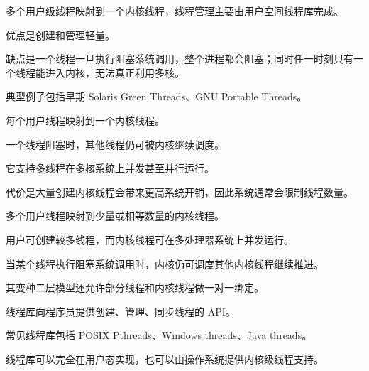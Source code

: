 \begin{points}
  \item 多个用户级线程映射到一个内核线程，线程管理主要由用户空间线程库完成。
  \item 优点是创建和管理轻量。
  \item 缺点是一个线程一旦执行阻塞系统调用，整个进程都会阻塞；同时任一时刻只有一个线程能进入内核，无法真正利用多核。
  \item 典型例子包括早期 Solaris Green Threads、GNU Portable Threads。
\end{points}


\begin{points}
  \item 每个用户线程映射到一个内核线程。
  \item 一个线程阻塞时，其他线程仍可被内核继续调度。
  \item 它支持多线程在多核系统上并发甚至并行运行。
  \item 代价是大量创建内核线程会带来更高系统开销，因此系统通常会限制线程数量。
\end{points}


\begin{points}
  \item 多个用户线程映射到少量或相等数量的内核线程。
  \item 用户可创建较多线程，而内核线程可在多处理器系统上并发运行。
  \item 当某个线程执行阻塞系统调用时，内核仍可调度其他内核线程继续推进。
  \item 其变种二层模型还允许部分线程和内核线程做一对一绑定。
\end{points}


\begin{points}
  \item 线程库向程序员提供创建、管理、同步线程的 API。
  \item 常见线程库包括 POSIX Pthreads、Windows threads、Java threads。
  \item 线程库可以完全在用户态实现，也可以由操作系统提供内核级线程支持。
\end{points}


